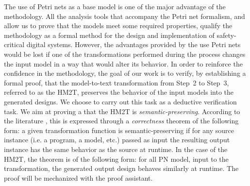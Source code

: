 \documentclass[pdflatex,sn-mathphys]{sn-jnl}%
\theoremstyle{thmstyleone}%
\theoremstyle{thmstyletwo}%
\theoremstyle{thmstylethree}%
\begin{document}

The use of Petri nets as a base model is one of the major advantage of
the \hilecop{} methodology. All the analysis tools that accompany the
Petri net formalism, and allow us to prove that the models meet some
required properties, qualify the \hilecop{} methodology as a formal
method for the design and implementation of safety-critical digital
systems. However, the advantages provided by the use Petri nets would
be lost if one of the transformations performed during the process
changes the input model in a way that would alter its behavior. %
In order to reinforce the confidence in the \hilecop{} methodology,
the goal of our work is to verify, by establishing a formal proof,
that the model-to-text transformation from Step~2 to Step~3, referred
to as the HM2T, preserves the behavior of the input models into the
generated \vhdl{} designs. We choose to carry out this task as a
deductive verification task.  We aim at proving a that the HM2T is
\textit{semantic-preserving}. According to the literature
\cite{Patrignani2019,Leroy2009}, this is expressed through a
\textit{correctness} theorem of the following form: a given
transformation function is semantic-preserving if for any source
instance (i.e. a program, a model, etc.) passed as input the resulting
output instance has the same behavior as the source at runtime.  In
the case of the HM2T, the theorem is of the following form: for all PN
model, input to the transformation, the generated output \vhdl{}
design behaves similarly at runtime. The proof will be mechanized with
the \coq{} proof assistant.
\end{document}
